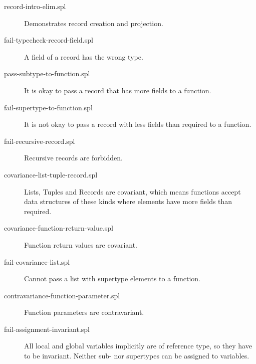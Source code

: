 \documentclass[a4paper]{article}
\begin{document}
\begin{description}

  \item[record-intro-elim.spl] Demonstrates record creation and projection.

  \item[fail-typecheck-record-field.spl] A field of a record has the wrong type.

  \item[pass-subtype-to-function.spl] It is okay to pass a record that has more
  fields to a function.

  \item[fail-supertype-to-function.spl] It is not okay to pass a record with
  less fields than required to a function.

  \item[fail-recursive-record.spl] Recursive records are forbidden.

  \item[covariance-list-tuple-record.spl] Lists, Tuples and Records are
  covariant, which means functions accept data structures of these kinds where
  elements have more fields than required.

  \item[covariance-function-return-value.spl] Function return values are
  covariant.

  \item[fail-covariance-list.spl] Cannot pass a list with supertype elements to
  a function.

  \item[contravariance-function-parameter.spl] Function parameters are
  contravariant.

  \item[fail-assignment-invariant.spl] All local and global variables implicitly
  are of reference type, so they have to be invariant.  Neither sub- nor
  supertypes can be assigned to variables.

\end{description}




\end{document}
